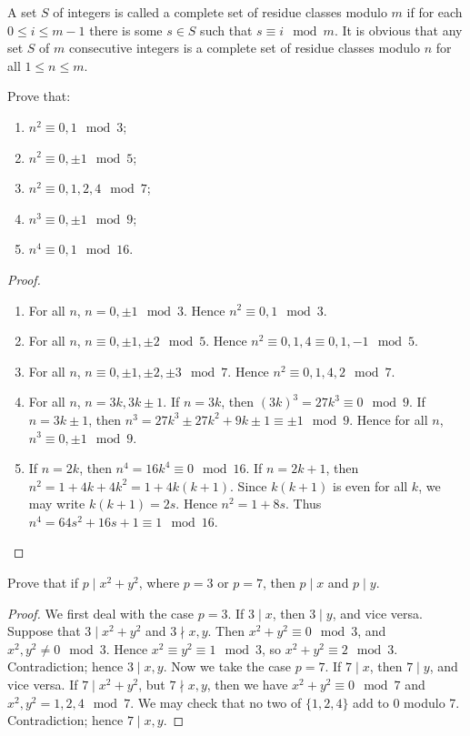 A set $S$ of integers is called a complete set of residue classes modulo $m$ if for each $0 \le i \le m-1$ there is some $s \in S$ such that $s \equiv i\mod{m}$.  It is obvious that any set $S$ of $m$ consecutive integers is a complete set of residue classes modulo $n$ for all $1 \le n \le m$.
\begin{prb}
Prove that:
\begin{enumerate}
\item $n^2\equiv0,1\mod{3}$;
\item $n^2\equiv0,\pm1\mod{5}$;
\item $n^2\equiv0,1,2,4\mod{7}$;
\item $n^3\equiv0,\pm1\mod{9}$;
\item $n^4\equiv0,1\mod{16}$.
\end{enumerate}
\begin{proof}
\begin{enumerate}
\item For all $n$, $n = 0,\pm1\mod{3}$.  Hence $n^2\equiv0,1\mod{3}$.
\item For all $n$, $n\equiv0,\pm1,\pm2\mod{5}$.  Hence $n^2\equiv0,1,4\equiv0,1,-1\mod{5}$.
\item For all $n$, $n\equiv0,\pm1,\pm2,\pm3\mod{7}$.  Hence $n^2\equiv0,1,4,2\mod{7}$.
\item For all $n$, $n = 3k, 3k\pm1$.  If $n = 3k$, then $(3k)^3=27k^3\equiv0\mod{9}$.  If $n = 3k\pm1$, then $n^3=27k^3\pm27k^2+9k\pm1\equiv\pm1\mod{9}$.  Hence for all $n$, $n^3\equiv0,\pm1\mod{9}$.
\item If $n = 2k$, then $n^4=16k^4\equiv0\mod{16}$.  If $n = 2k+1$, then $n^2 = 1+4k+4k^2 = 1+4k(k+1)$.  Since $k(k+1)$ is even for all $k$, we may write $k(k+1) = 2s$.  Hence $n^2 = 1+8s$.  Thus $n^4 = 64s^2+16s+1\equiv1\mod{16}$.
\end{enumerate}
\end{proof}
\end{prb}
\begin{prb}
Prove that if $p\mid x^2+y^2$, where $p = 3$ or $p = 7$, then $p\mid x$ and $p \mid y$.
\begin{proof}
We first deal with the case $p = 3$.  If $3 \mid x$, then $3 \mid y$, and vice versa.  Suppose that $3\mid x^2+y^2$ and $3\nmid x,y$.  Then $x^2+y^2\equiv0\mod{3}$, and $x^2, y^2\neq 0\mod{3}$.  Hence $x^2\equiv y^2\equiv1\mod{3}$, so $x^2+y^2\equiv2\mod{3}$.  Contradiction; hence $3 \mid x,y$.
Now we take the case $p = 7$.  If $7 \mid x$, then $7 \mid y$, and vice versa.  If $7\mid x^2+y^2$, but $7\nmid x,y$, then we have $x^2+y^2\equiv0\mod{7}$ and $x^2,y^2 = 1,2,4\mod{7}$.  We may check that no two of $\{1,2,4\}$ add to 0 modulo 7.  Contradiction; hence $7\mid x,y$.
\end{proof}
\end{prb}
